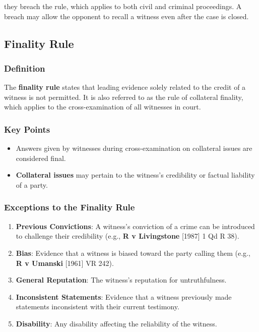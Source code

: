 they breach the rule, which applies to both civil and criminal
proceedings. A breach may allow the opponent to recall a witness even
after the case is closed.

\subsection{  Finality Rule}\label{finality-rule}

\subsubsection{Definition}\label{definition}

The \textbf{finality rule} states that leading evidence solely related
to the credit of a witness is not permitted. It is also referred to as
the rule of collateral finality, which applies to the cross-examination
of all witnesses in court.

\subsubsection{Key Points}\label{key-points-1}

\begin{itemize}
\tightlist
\item
  Answers given by witnesses during cross-examination on collateral
  issues are considered final.
\item
  \textbf{Collateral issues} may pertain to the witness's credibility or
  factual liability of a party.
\end{itemize}

\subsubsection{Exceptions to the Finality
Rule}\label{exceptions-to-the-finality-rule}

\begin{enumerate}
\def\labelenumi{\arabic{enumi}.}
\tightlist
\item
  \textbf{Previous Convictions}: A witness's conviction of a crime can
  be introduced to challenge their credibility (e.g., \textbf{R v
  Livingstone} {[}1987{]} 1 Qd R 38).
\item
  \textbf{Bias}: Evidence that a witness is biased toward the party
  calling them (e.g., \textbf{R v Umanski} {[}1961{]} VR 242).
\item
  \textbf{General Reputation}: The witness's reputation for
  untruthfulness.
\item
  \textbf{Inconsistent Statements}: Evidence that a witness previously
  made statements inconsistent with their current testimony.
\item
  \textbf{Disability}: Any disability affecting the reliability of the
  witness.
\end{enumerate}

